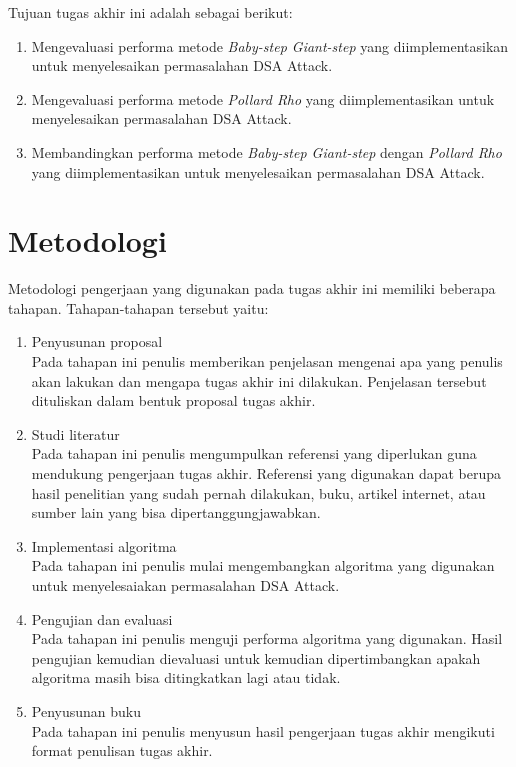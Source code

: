 Tujuan tugas akhir ini adalah sebagai berikut:

\begin{enumerate}
\item Mengevaluasi performa metode \textit{Baby-step Giant-step} yang diimplementasikan untuk menyelesaikan permasalahan DSA Attack.
\item Mengevaluasi performa metode \textit{Pollard Rho} yang diimplementasikan untuk menyelesaikan permasalahan DSA Attack.
\item Membandingkan performa metode \textit{Baby-step Giant-step} dengan \textit{Pollard Rho} yang diimplementasikan untuk menyelesaikan permasalahan DSA Attack.
\end{enumerate}

\section {Metodologi}

Metodologi pengerjaan yang digunakan pada tugas akhir ini memiliki beberapa tahapan. Tahapan-tahapan tersebut yaitu:

\begin{enumerate}
\item Penyusunan proposal\\
Pada tahapan ini penulis memberikan penjelasan mengenai apa yang penulis akan lakukan dan mengapa tugas akhir ini dilakukan. Penjelasan tersebut dituliskan dalam bentuk proposal tugas akhir.
\item Studi literatur\\
Pada tahapan ini penulis mengumpulkan referensi yang diperlukan guna mendukung pengerjaan tugas akhir. Referensi yang digunakan dapat berupa hasil penelitian yang sudah pernah dilakukan, buku, artikel internet, atau sumber lain yang bisa dipertanggungjawabkan.
\item Implementasi algoritma\\
Pada tahapan ini penulis mulai mengembangkan algoritma yang digunakan untuk menyelesaiakan permasalahan DSA Attack.
\item Pengujian dan evaluasi\\
Pada tahapan ini penulis menguji performa algoritma yang digunakan. Hasil pengujian kemudian dievaluasi untuk kemudian dipertimbangkan apakah algoritma masih bisa ditingkatkan lagi atau tidak.
\item Penyusunan buku\\
Pada tahapan ini penulis menyusun hasil pengerjaan tugas akhir mengikuti format penulisan tugas akhir.
\end{enumerate}


